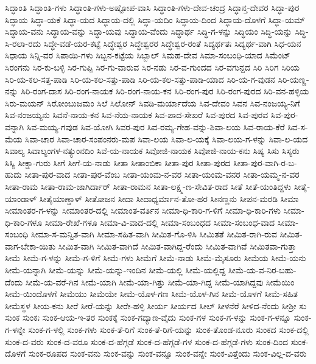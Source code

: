 ಸಿದ್ಧಾಂತಿ
ಸಿದ್ಧಾಂತಿ-ಗಳು
ಸಿದ್ಧಾಂತಿ-ಗಳು-ಅಷ್ಟೋಪ-ವಾಸಿ
ಸಿದ್ಧಾಂತಿ-ಗಳು-ದೇವ-ಚಂದ್ರ
ಸಿದ್ಧಾನ್ತ-ದೇವರ
ಸಿದ್ಧಾ-ಪುರ
ಸಿದ್ಧಾಯ
ಸಿದ್ಧಾ-ಯಕೆ
ಸಿದ್ಧಾ-ಯದ
ಸಿದ್ಧಾಯ-ದಲ್ಲಿ
ಸಿದ್ಧಾ-ಯದಿಂ
ಸಿದ್ಧಾಯ-ದಿಂದ
ಸಿದ್ಧಾಯ-ದೊಳಗೆ
ಸಿದ್ಧಾ-ಯಮ್
ಸಿದ್ಧಾಯ-ವನು
ಸಿದ್ಧಾಯ-ವನ್ನು
ಸಿದ್ಧಾ-ಯವು
ಸಿದ್ಧಾಯ-ವೆಂದು
ಸಿದ್ಧಾರ್ಥ
ಸಿದ್ಧಿ-ಗ-ಳನ್ನು
ಸಿದ್ಧಿಯಂ
ಸಿದ್ಧಿ-ಯನ್ನು
ಸಿದ್ಧಿ-ಸಿ-ರಲಾ-ರದು
ಸಿದ್ಧೇ-ವಡೆ-ಯರ-ಕಟ್ಟೆ
ಸಿದ್ಧೇಶ್ವರ
ಸಿದ್ಧೇಶ್ವರರ
ಸಿದ್ಧೇಶ್ವರ-ರಂತೆ
ಸಿದ್ಯರ್ಥತಃ
ಸಿದ್ಯರ್ಥ-ವಾಗಿ
ಸಿಧ-ಯನ
ಸಿಧಾಯ
ಸಿನ್ನಿ-ವರ
ಸಿಪಾಯಿ-ಗಳು
ಸಿಬ್ಬನ-ಕಟ್ಟೆಯ
ಸಿಬ್ಬಾಲ್
ಸಿಮಹ-ದೇವ
ಸಿಮಾ-ಸಂಬಂಧಿ-ಯಾದ
ಸಿಮೆಂಟ್
ಸಿರಂಗನು
ಸಿರ-ಕು-ಬಳ್ಳಿ
ಸಿರ-ಗುಪ್ಪಿ
ಸಿರ-ಗು-ವಾರುವ
ಸಿರ-ನಡು
ಸಿರ-ವ-ಗುಂದದ
ಸಿರ-ವಗುನ್ದದ
ಸಿರಿ
ಸಿರಿಗ
ಸಿರಿಯ
ಸಿರಿ-ಯ-ಕಲ-ಸತ್ತ-ಪಾಡಿ
ಸಿರಿ-ಯ-ಕಲ-ಸತ್ತು-ಪಾಡಿ
ಸಿರಿ-ಯ-ಕಲ-ಸತ್ತು-ಪಾಡಿ-ಯಾದ
ಸಿರಿ-ಯ-ಗ-ವುಡನ
ಸಿರಿ-ಯಣ್ಣ-ನನ್ನು
ಸಿರಿ-ರಂಗ-ದಾಸ
ಸಿರಿ-ರಂಗ-ನಾಯಕ
ಸಿರಿ-ರಂಗ-ನಾಯ-ಕನ
ಸಿರಿ-ರಂಗ-ಪುರ
ಸಿರಿ-ರಂಗ-ಪುರದ
ಸಿರಿ-ವನ-ಹಳ್ಳಿಯ
ಸಿರು-ಮಯನ್
ಸಿರೋಂಬುಜಮಂ
ಸಿಲೆ
ಸಿಲೋನ್
ಸಿವಡಿ-ಮರ್ಯಾದೆಯ
ಸಿವ-ದೇವಂ
ಸಿವನ
ಸಿವ-ನಂಜಯ್ಯ-ನಿಗೆ
ಸಿವ-ನಂಜಯ್ಯನು
ಸಿವನೆ-ನಾಯ-ಕನ
ಸಿವ-ನೆಯ-ನಾಯಕ
ಸಿವ-ಪಾದ-ಸೇಖರೆ
ಸಿವ-ಪುರದ
ಸಿವ-ಪುರವ
ಸಿವ-ಪುರ-ವನ್ನಾಗಿ
ಸಿವ-ಮಯ್ಯ-ಗವುಡ
ಸಿವ-ಯೋಗಿ
ಸಿವರ-ಪುರ
ಸಿವ-ರಮ್ಯ-ಗೇಹ-ವನ್ನು-ಶಿವಾ-ಲಯ
ಸಿವ-ರಾಯ-ಕೆರೆ
ಸಿವ-ಸ-ಮೆಯ
ಸಿವಾ-ಚಾರ
ಸಿವಾ-ಚಾರ-ಸಂಪಂನರು-ಮಪ
ಸಿವಾ-ಲಯ
ಸಿವಾ-ಲ-ಯಕ್ಕೆ
ಸಿವಾ-ಲಯ-ಗ-ಳನ್ನು
ಸಿವಾ-ಲ-ಯದ
ಸಿವಾಲ್ಯ
ಸಿವಾಲ್ಯಂಗಳ-ನತ್ಯುಂನದಿಂ
ಸಿವೆ-ಯ-ನಾಯಕ
ಸಿವೋಜಿ-ನಾಯಕ
ಸಿವೋಜಿ-ನಾಯ-ಕನು
ಸಿಷ್ಯ
ಸಿಸು
ಸಿಸ್ಯರು
ಸಿಸ್ಯಿ
ಸೀಕ್ಷಾ-ಗುರು
ಸೀಗೆ
ಸೀಗೆ-ಯ-ನಾಡು
ಸೀತಾ
ಸೀತಾಂಬಿಕಾ
ಸೀತಾ-ಪುರ
ಸೀತಾ-ಪುರದ
ಸೀತಾ-ಪುರ-ವಾಗಿ-ರ-ಬ-ಹುದು
ಸೀತಾ-ಪುರ-ವಾದ
ಸೀತಾ-ಪುರ-ವೆಂಬ
ಸೀತಾ-ಯಂಮ-ನ-ವರ
ಸೀತಾ-ಯಂಮ-ವನರ
ಸೀತಾ-ಯಮ್ಮ-ನ-ವರ
ಸೀತಾ-ರಾಮ
ಸೀತಾ-ರಾಮ-ಜಾಗಿರ್ದಾರ್
ಸೀತಾ-ರಾಮನ
ಸೀತಾ-ಲಕ್ಷ್ಮ-ಣ-ಸೇವಿತ-ರಾದ
ಸೀತೆ
ಸೀತೆ-ಯಂತಿದ್ದಳು
ಸೀತೈ-ಯಾಂಡಾಳ್
ಸೀತೈಯಾಣ್ಡಾಳ್
ಸೀತೋಜನ
ಸೀದಾ
ಸೀದಾಧ್ಯರ್ಮಾನ-ತೋ-ಹರ
ಸೀನಣ್ಣನು
ಸೀಪನ-ಮರಡಿ
ಸೀಮಾ
ಸೀಮಾಂತರ-ಗ-ಳನ್ನು
ಸೀಮಾಂತರ-ದಲ್ಲಿ
ಸೀಮಾಂತ-ವರ್ತಿನ
ಸೀಮಾ-ಧಿ-ಕಾರಿ-ಗ-ಳಿಗೆ
ಸೀಮಾ-ಧಿ-ಕಾರಿ-ಗಳು
ಸೀಮಾ-ಧಿ-ಕಾರಿ-ಗಳೂ
ಸೀಮಾ-ರೇಖೆ-ಗಳೂ
ಸೀಮಾ-ವಿ-ವಾದ-ದಲ್ಲಿ
ಸೀಮಾ-ಸಂಬಂಧದ
ಸೀಮಾ-ಸಂಬಂಧ-ವಾದ
ಸೀಮಾ-ಸಂಬಂಧಿ
ಸೀಮಾ-ಸ-ಮನ್ವಿತ-ವಾಗಿ
ಸೀಮಾ-ಸಹಿತ-ವಾಗಿ
ಸೀಮಿತ-ಗೊ-ಳಿಸಿ
ಸೀಮಿತತೆ
ಸೀಮಿತ-ರಾಗಿ-ರುವ
ಸೀಮಿತ-ವಾಗ-ಬೇಕಾ-ಯಿತು
ಸೀಮಿತ-ವಾಗಿ
ಸೀಮಿತ-ವಾಗಿದೆ
ಸೀಮಿತ-ವಾಗಿದ್ದ-ರೆಂದು
ಸೀಮಿತ-ವಾಗಿವೆ
ಸೀಮಿತವಾ-ಗುತ್ತಾ
ಸೀಮೆ
ಸೀಮೆ-ಗ-ಳನ್ನು
ಸೀಮೆ-ಗ-ಳಿಗೆ
ಸೀಮೆ-ಗಳು
ಸೀಮೆಗೆ
ಸೀಮೆ-ನಾಡು
ಸೀಮೆ-ಮೈಸೂರು
ಸೀಮೆಯ
ಸೀಮೆ-ಯನು
ಸೀಮೆ-ಯನ್ನಾಗಿ
ಸೀಮೆ-ಯನ್ನು
ಸೀಮೆ-ಯನ್ನು-ಇಂದಿನ
ಸೀಮೆ-ಯಲ್ಲಿ
ಸೀಮೆ-ಯಲ್ಲಿದ್ದ
ಸೀಮೆ-ಯ-ವ-ನಿರ-ಬಹು-ದೆಂದು
ಸೀಮೆ-ಯ-ವರೆ-ಗಿನ
ಸೀಮೆ-ಯಾಗಿ
ಸೀಮೆ-ಯಾ-ಗಿತ್ತು
ಸೀಮೆ-ಯಾ-ಗಿದ್ದ
ಸೀಮೆ-ಯಾಗಿದ್ದವು
ಸೀಮೆಯಿಂ
ಸೀಮೆ-ಯಿಂದೊಳಗೆ
ಸೀಮೆಯು
ಸೀಮೆಯೇ
ಸೀಮೆ-ಯೊಳ-ಗಣ
ಸೀಮೆ-ಯೊಳ-ಗಿನ
ಸೀಮೆ-ಯೊಳಗೆ
ಸೀಮೆ-ಸಹಿತ
ಸೀಮೆಸ್ಥಳ
ಸೀಯ-ಕನು
ಸೀರೆ
ಸೀರೆ-ಯನ್ನು
ಸೀರೇ-ಹಳ್ಳಿ
ಸೀರ್ಯ
ಸೀರ್ಯದ
ಸೀಲ್
ಸೀಳನೆರೆ
ಸೀಳಿದ-ನೆಂದು
ಸೀಶ್ರೀ
ಸು
ಸುಂಕ
ಸುಂಕಃ
ಸುಂಕ-ಆಯ-ಇ-ತರ
ಸುಂಕಕ್ಕೆ
ಸುಂಕ-ಗದ್ಯಾಣ-ವೈದು
ಸುಂಕ-ಗಳ
ಸುಂಕ-ಗ-ಳನ್ನು
ಸುಂಕ-ಗ-ಳನ್ನೂ
ಸುಂಕ-ಗ-ಳನ್ನೇ
ಸುಂಕ-ಗ-ಳಲ್ಲಿ
ಸುಂಕ-ಗಳು
ಸುಂಕ-ತೆ-ರಿಗೆ
ಸುಂಕ-ತೆ-ರಿಗೆ-ಯನ್ನು
ಸುಂಕ-ತೊಂಡ-ನೂರು
ಸುಂಕದ
ಸುಂಕ-ದಲ್ಲಿ
ಸುಂಕ-ದ-ವರು
ಸುಂಕ-ದ-ವರೂ
ಸುಂಕ-ದ-ಹೆಗ್ಗಡೆ
ಸುಂಕ-ದ-ಹೆಗ್ಗಡೆ-ಗಳ
ಸುಂಕ-ದ-ಹೆಗ್ಗಡೆ-ಗಳು
ಸುಂಕ-ದಿಂದ
ಸುಂಕ-ದೊಳಗೆ
ಸುಂಕ-ರೂಪದ
ಸುಂಕ-ವನು
ಸುಂಕ-ವನ್ನು
ಸುಂಕ-ವನ್ನೂ
ಸುಂಕ-ವನ್ನೇ
ಸುಂಕ-ವಿತ್ತೆಂದು
ಸುಂಕ-ವಿಲ್ಲ-ದ-ವರು
